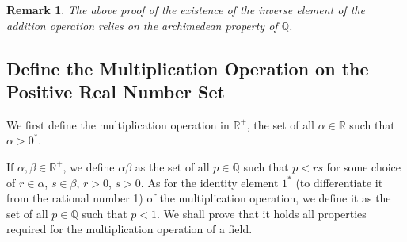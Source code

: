 \documentclass{article}
\newtheorem{remark}{Remark}[section]
\begin{document}
\begin{remark}
  The above proof of the existence of the inverse element of the addition 
  operation relies on the archimedean property of $\mathbb{Q}$.
\end{remark}

\subsection{Define the Multiplication Operation on the Positive Real Number Set}

We first define the multiplication operation in $\mathbb{R^+}$, the set of all 
$\alpha \in \mathbb{R}$ such that $\alpha > 0^*$.

If $\alpha, \beta \in \mathbb{R^+}$, we define $\alpha \beta$ as the set of 
all $p \in \mathbb{Q}$ such that $p < rs$ for some choice of $r \in \alpha$, 
$s \in \beta$, $r > 0$, $s > 0$. As for the identity element $1^*$ (to 
differentiate it from the rational number 1) of the multiplication operation, we 
define it as the set of all $p \in \mathbb{Q}$ such that $p < 1$. We shall prove 
that it holds all properties required for the multiplication operation of a 
field.
\end{document}
